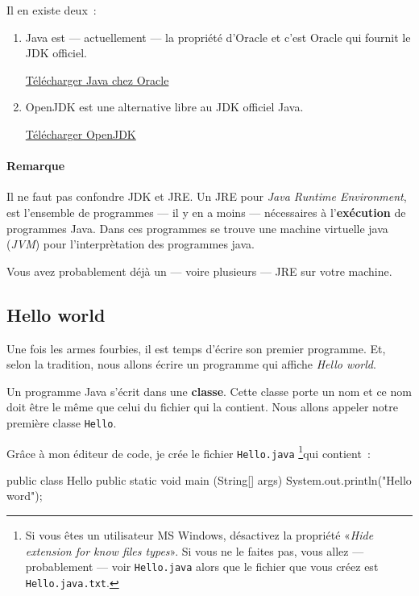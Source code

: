 Il en existe deux~:

\begin{enumerate}
	
	\item Java est — actuellement — la propriété d'Oracle et c'est Oracle qui
		fournit le JDK officiel. 

		\href{http://www.oracle.com/technetwork/java/javase/downloads}
		{Télécharger Java chez Oracle}

	\item OpenJDK est une alternative libre au JDK officiel Java.

		\href{http://openjdk.java.net/}{Télécharger OpenJDK}

\end{enumerate}


\paragraph {Remarque} Il ne faut pas confondre JDK et JRE. Un JRE
pour \textit{Java Runtime Environment}, est l'ensemble de programmes — il y en
a moins — nécessaires à l'\textbf{exécution} de programmes Java. Dans ces
programmes se trouve une machine virtuelle java (\textit{JVM}) pour
l'interprètation des programmes java. 

Vous avez probablement déjà un — voire plusieurs — JRE sur votre machine. 


\subsection{Hello world}
\label{helloworld}

Une fois les armes fourbies, il est temps d'écrire son premier programme. Et,
selon la tradition, nous allons écrire un programme qui affiche \textit{Hello
world}.

Un programme Java s'écrit dans une \textbf{classe}. Cette classe porte un nom et
ce nom doit être le même que celui du fichier qui la contient. Nous allons
appeler notre première classe \texttt{Hello}. 

Grâce à mon éditeur de code, je crée le fichier \texttt{Hello.java}
\footnote{%
	Si vous êtes un utilisateur MS Windows, désactivez la propriété
	«\textit{Hide extension for know files types}». Si vous ne le faites pas,
	vous allez — probablement — voir \texttt{Hello.java} alors que le fichier
	que vous créez est \texttt{Hello.java.txt}.
}qui contient~:

\begin{java}
public class Hello{
	public static void main (String[] args) { 
		System.out.println("Hello word");
	}
}
\end{java}

